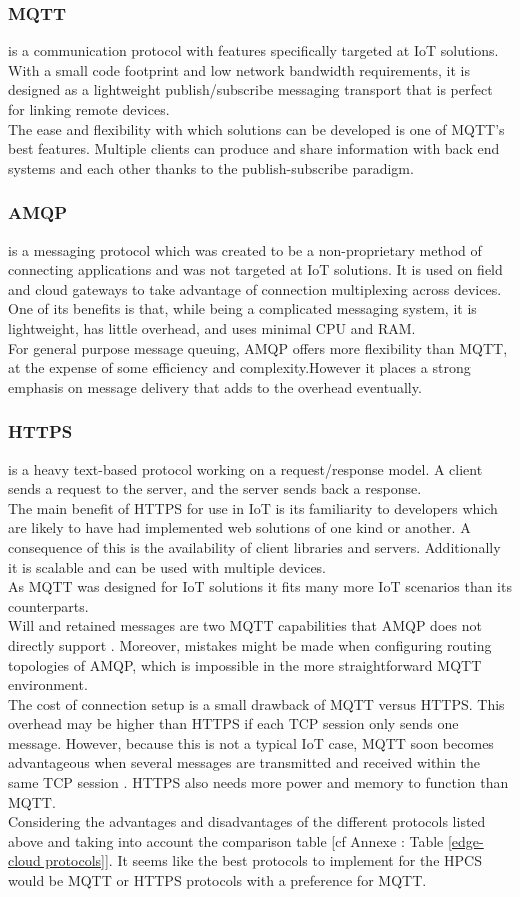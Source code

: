 \subsubsection{MQTT} is a communication protocol with features specifically targeted at IoT solutions. With a small code footprint and low network bandwidth requirements, it is designed as a lightweight publish/subscribe messaging transport that is perfect for linking remote devices.\\
The ease and flexibility with which solutions can be developed is one of MQTT's best features. Multiple clients can produce and share information with back end systems and each other thanks to the publish-subscribe paradigm.

\subsubsection{AMQP} is a messaging protocol which was created to be a non-proprietary method of connecting applications and was not targeted at IoT solutions. It is used on field and cloud gateways to take advantage of connection multiplexing across devices. One of its benefits is that, while being a complicated messaging system, it is lightweight, has little overhead, and uses minimal CPU and RAM. \\
For general purpose message queuing, AMQP offers more flexibility than MQTT, at the expense of some efficiency and complexity.However it places a strong emphasis on message delivery that adds to the overhead eventually.

\subsubsection{HTTPS} is a heavy text-based protocol working on a request/response model. A client sends a request to the server, and the server sends back a response.\\
The main benefit of HTTPS for use in IoT is its familiarity to developers which are likely to have had implemented web solutions of one kind or another. A consequence of this is the availability of client libraries and servers. Additionally it is scalable and can be used with multiple devices.\\


As MQTT was designed for IoT solutions it fits many more IoT scenarios than its counterparts. \\
Will and retained messages are two MQTT capabilities that AMQP does not directly support \cite{b2}. Moreover, mistakes might be made when configuring routing topologies of AMQP, which is impossible in the more straightforward MQTT environment.\\
The cost of connection setup is a small drawback of MQTT versus HTTPS. This overhead may be higher than HTTPS if each TCP session only sends one message. However, because this is not a typical IoT case, MQTT soon becomes advantageous when several messages are transmitted and received within the same TCP session \cite{b3}. HTTPS also needs more power and memory to function than MQTT.\\

Considering the advantages and disadvantages of the different protocols listed above and taking into account the comparison table [cf Annexe : Table \ref{edge-cloud protocols}].
It seems like the best protocols to implement for the HPCS would be MQTT or HTTPS protocols with a preference for MQTT.